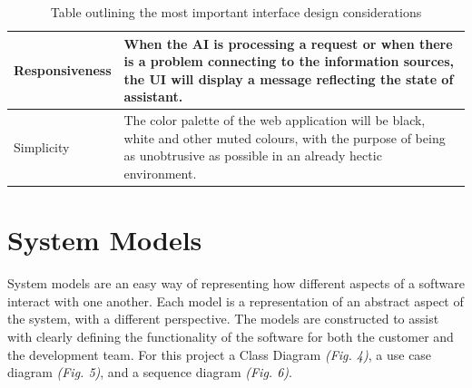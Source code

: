 \documentclass[]{IEEEtran}
\begin{document}
\begin{table}[h]
\begin{tabular}{| m{2cm} | m{5.5cm} | }
		\hline
		
		Responsiveness & When the AI is processing a request or when there is a problem connecting to the information sources, the UI will display a message reflecting the state of assistant. \\
		
		\hline 
		
		Simplicity & The color palette of the web application will be black, white and other muted colours, with the purpose of being as unobtrusive as possible in an already hectic environment. \\
		
		\hline
		
	
	\end{tabular}
		\caption{Table outlining the most important interface design considerations}
	
	\end{table}
	
	\section{System Models}
	
	System models are an easy way of representing how different aspects of a software interact with one another. Each model is a representation of an abstract aspect of the system, with a different perspective. The models are constructed to assist with clearly defining the functionality of the software for both the customer and the development team. For this project a Class Diagram \textit{(Fig. 4)}, a use case diagram \textit{(Fig. 5)}, and a sequence diagram \textit{(Fig. 6)}.
	
\end{document}
